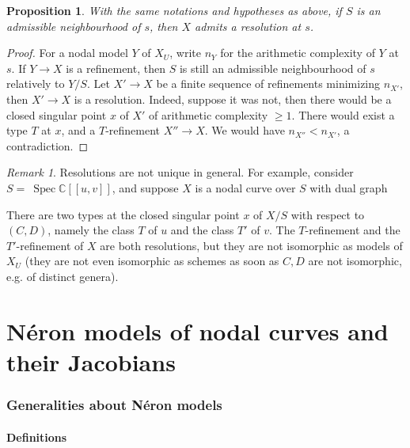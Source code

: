 \documentclass[a4paper,10pt,twoside]{article}
\newcommand{\ra}{\rightarrow}
\newcommand{\C}{\mathbb{C}}
\DeclareMathOperator{\spec}{Spec}
\newtheorem{prop}[thm]{Proposition}
\theoremstyle{definition}
\theoremstyle{remark}
\newtheorem{rem}{Remark}[thm]
\begin{document}
\begin{prop}\label{proposition existence des resolutions}
	With the same notations and hypotheses as above, if $S$ is an admissible neighbourhood of $s$, then $X$ admits a resolution at $s$.
\end{prop}

\begin{proof}
For a nodal model $Y$ of $X_U$, write $n_Y$ for the arithmetic complexity of $Y$ at $s$. If $Y \to X$ is a refinement, then $S$ is still an admissible neighbourhood of $s$ relatively to $Y/S$. Let $X'\ra X$ be a finite sequence of refinements minimizing $n_{X'}$, then $X'\ra X$ is a resolution. Indeed, suppose it was not, then there would be a closed singular point $x$ of $X'$ of arithmetic complexity $\geq 1$. There would exist a type $T$ at $x$, and a $T$-refinement $X''\to X$. We would have $n_{X''}<n_{X'}$, a contradiction.
\end{proof}

\begin{rem}
Resolutions are not unique in general. For example, consider $S=~\spec\C[[u,v]]$, and suppose $X$ is a nodal curve over $S$ with dual graph

\begin{center}
\end{center}

There are two types at the closed singular point $x$ of $X/S$ with respect to $(C,D)$, namely the class $T$ of $u$ and the class $T'$ of $v$. The $T$-refinement and the $T'$-refinement of $X$ are both resolutions, but they are not isomorphic as models of $X_U$ (they are not even isomorphic as schemes as soon as $C,D$ are not isomorphic, e.g. of distinct genera).
\end{rem}


\part{N\'eron models of nodal curves and their Jacobians}\label{part2}

\section{Generalities about N\'eron models}\label{Generalities_about_NMs}

\subsection{Definitions}
\end{document}
